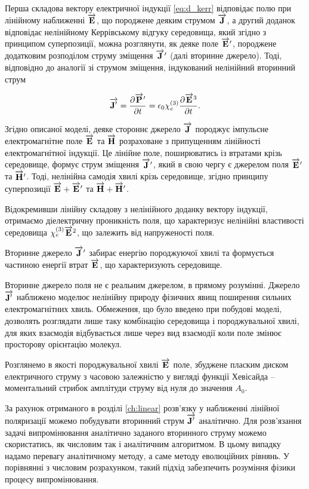Перша складова вектору електричної індукції \eqref{eq:d_kerr} відповідає 
полю при лінійному наближенні $ \overrightarrow{\mathbf E} $, що породжене деяким 
струмом $ \overrightarrow{\mathbf J} $, а другий доданок відповідає нелінійному Керрівському 
відгуку середовища, який згідно з принципом суперпозиції, можна розглянути, 
як деяке поле $ \overrightarrow{\mathbf E}^\prime $, породжене додатковим розподілом струму 
зміщення $ \overrightarrow{\mathbf J}^\prime $ (далі вторинне джерело). Тоді, відповідно до
аналогії зі струмом зміщення, індукований нелінійний вторинний струм

\begin{equation} \label{eq:j_kerr}
\overrightarrow{\mathbf J^\prime} = \frac{\partial \overrightarrow{\mathbf P}^\prime}{\partial t} = 
\epsilon_0 \chi_e^{(3)} \frac{\partial \overrightarrow{\mathbf E}^3}{\partial t}.
\end{equation}

Згідно описаної моделі, деяке стороннє джерело $ \overrightarrow{\mathbf J} $ породжує 
імпульсне електромагнітне поле $ \overrightarrow{\mathbf E} $ та $ \overrightarrow{\mathbf H} $ розраховане
з припущенням лінійності електромагнітної індукції. Це лінійне поле, 
поширюватись із втратами крізь середовище, формує струм зміщення 
$ \overrightarrow{\mathbf J}^\prime $, який в свою чергу є джерелом поля $ \overrightarrow{\mathbf E}^\prime $ 
та $ \overrightarrow{\mathbf H}^\prime $. Тоді, нелінійна самодія хвилі крізь середовище, 
згідно принципу суперпозиції $ \overrightarrow{\mathbf E} + \overrightarrow{\mathbf E}^\prime $ та 
$ \overrightarrow{\mathbf H} + \overrightarrow{\mathbf H}^\prime $.

Відокремивши лінійну складову з нелінійного доданку вектору індукції, 
отримаємо діелектричну проникність поля, що характеризує нелінійні 
властивості середовища $ \chi_e^{(3)} \overrightarrow{\mathbf E}^2 $, що залежить від 
напруженості поля.

Вторинне джерело $ \overrightarrow{\mathbf J}^\prime $ забирає енергію породжуючої хвилі та 
формується частиною енергії втрат $ \overrightarrow{\mathbf E} $, що характеризують середовище.

Вторинне джерело поля не є реальним джерелом, в прямому розумінні. 
Джерело $ \overrightarrow{\mathbf J^\prime} $ наближено моделює нелінійну природу фізичних 
явищ поширення сильних електромагнітних хвиль. Обмеження, що було 
введено при побудові моделі, дозволять розглядати лише таку комбінацію 
середовища і породжувальної хвилі, для яких взаємодія відбувається лише
через вид взаємодії коли поле змінює просторову орієнтацію молекул.

Розглянемо в якості породжувальної хвилі $ \overrightarrow{\mathbf E} $ поле, збуджене 
пласким диском електричного струму з часовою залежністю у вигляді 
функції Хевісайда -- моментальний стрибок амплітуди струму від нуля до 
значення $ A_0 $.

За рахунок отриманого в розділі \ref{ch:linear} розв'язку у наближенні 
лінійної поляризації можемо побудувати вторинний струм $ \overrightarrow{\mathbf J^\prime} $
аналітично. Для розв'язання задачі випромінювання аналітично заданого 
вторинного струму можемо скористатись, як числовим так і аналітичним 
алгоритмом. В цьому випадку надамо перевагу аналітичному методу, а саме 
методу еволюційних рівнянь. У порівнянні з числовим розрахунком, такий підхід
забезпечить розуміння фізики процесу випромінювання.

